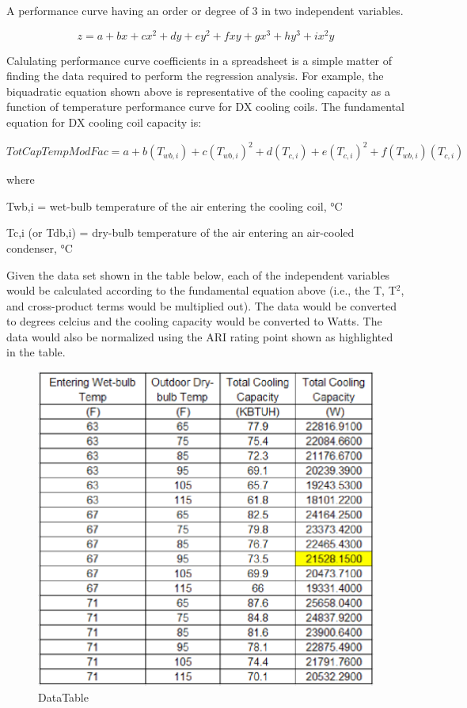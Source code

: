 A performance curve having an order or degree of 3 in two independent variables.

\begin{equation}
z = a + bx + c{x^2} + dy + e{y^2} + fxy + g{x^3} + h{y^3} + i{x^2}y
\end{equation}

Calulating performance curve coefficients in a spreadsheet is a simple matter of finding the data required to perform the regression analysis. For example, the biquadratic equation shown above is representative of the cooling capacity as a function of temperature performance curve for DX cooling coils. The fundamental equation for DX cooling coil capacity is:

\begin{equation}
TotCapTempModFac = a + b\left( {{T_{wb,i}}} \right) + c{\left( {{T_{wb,i}}} \right)^2} + d\left( {{T_{c,i}}} \right) + e{\left( {{T_{c,i}}} \right)^2} + f\left( {{T_{wb,i}}} \right)\left( {{T_{c,i}}} \right)
\end{equation}

where

Twb,i = wet-bulb temperature of the air entering the cooling coil, °C

Tc,i (or Tdb,i) = dry-bulb temperature of the air entering an air-cooled condenser, °C

Given the data set shown in the table below, each of the independent variables would be calculated according to the fundamental equation above (i.e., the T, T\(^{2}\), and cross-product terms would be multiplied out). The data would be converted to degrees celcius and the cooling capacity would be converted to Watts. The data would also be normalized using the ARI rating point shown as highlighted in the table.

\begin{figure}[htbp]
\centering
\includegraphics{media/image7865.png}
\caption{DataTable}
\end{figure}

